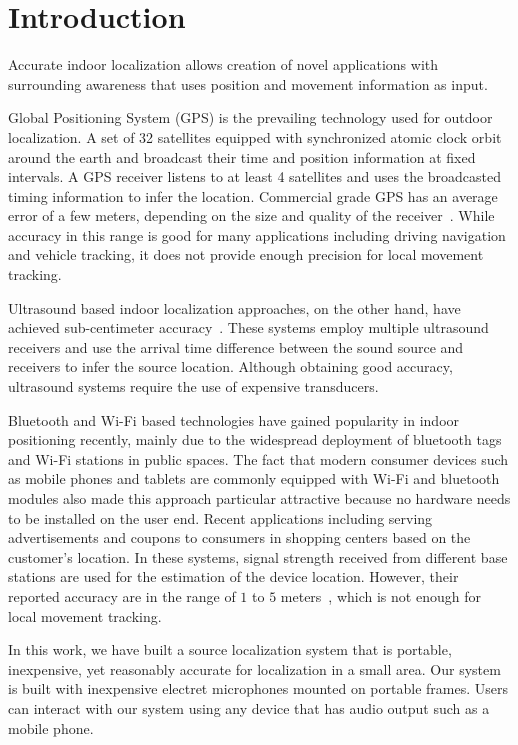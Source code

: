 \chapter{Introduction}

Accurate indoor localization allows creation of novel applications with surrounding awareness that uses position and movement information as input. 

Global Positioning System (GPS) is the prevailing technology used for outdoor localization. A set of 32 satellites equipped with synchronized atomic clock orbit around the earth and broadcast their time and position information at fixed intervals. A GPS receiver listens to at least 4 satellites and uses the broadcasted timing information to infer the location. Commercial grade GPS has an average error of a few meters, depending on the size and quality of the receiver~\cite{intro:gps}. While accuracy in this range is good for many applications including driving navigation and vehicle tracking, it does not provide enough precision for local movement tracking. 

Ultrasound based indoor localization approaches, on the other hand, have achieved sub-centimeter accuracy~\cite{intro:ultra}. These systems employ multiple ultrasound receivers and use the arrival time difference between the sound source and receivers to infer the source location. Although obtaining good accuracy, ultrasound systems require the use of expensive transducers.

Bluetooth and Wi-Fi based technologies have gained popularity in indoor positioning recently, mainly due to the widespread deployment of bluetooth tags and Wi-Fi stations in public spaces. The fact that modern consumer devices such as mobile phones and tablets are commonly equipped with Wi-Fi and bluetooth modules also made this approach particular attractive because no hardware needs to be installed on the user end. Recent applications including serving advertisements and coupons to consumers in shopping centers based on the customer's location. In these systems, signal strength received from different base stations are used for the estimation of the device location. However, their reported accuracy are in the range of $1$ to $5$ meters~\cite{intro:blue, intro:loc}, which is not enough for local movement tracking.

In this work, we have built a source localization system that is portable, inexpensive, yet reasonably accurate for localization in a small area. Our system is built with inexpensive electret microphones mounted on portable frames. Users can interact with our system using any device that has audio output such as a mobile phone.

